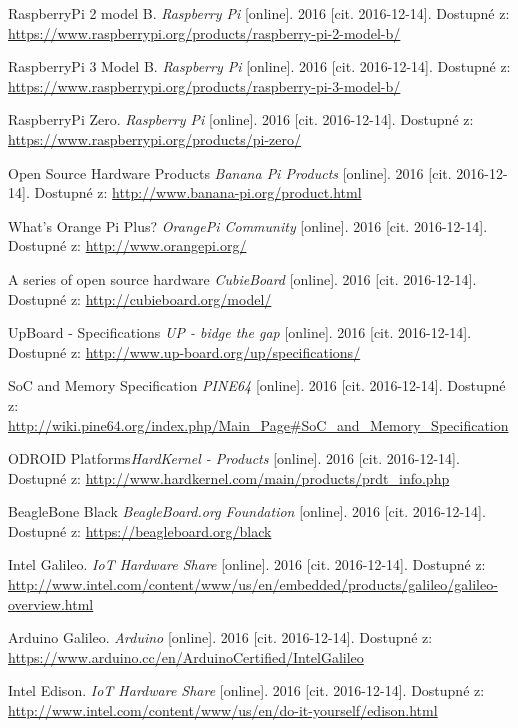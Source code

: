 \begin{literatura}{99}
 RaspberryPi 2 model B. \textit{Raspberry Pi} [online]. 2016 [cit. 2016-12-14]. Dostupné z: \url{https://www.raspberrypi.org/products/raspberry-pi-2-model-b/}

 RaspberryPi 3 Model B. \textit{Raspberry Pi} [online]. 2016 [cit. 2016-12-14]. Dostupné z: \url{https://www.raspberrypi.org/products/raspberry-pi-3-model-b/}

 RaspberryPi Zero. \textit{Raspberry Pi} [online]. 2016 [cit. 2016-12-14]. Dostupné z: \url{https://www.raspberrypi.org/products/pi-zero/}

 Open Source Hardware Products \textit{Banana Pi Products} [online]. 2016 [cit. 2016-12-14]. Dostupné z: \url{http://www.banana-pi.org/product.html}

 What’s Orange Pi Plus? \textit{OrangePi Community} [online]. 2016 [cit. 2016-12-14]. Dostupné z: \url{http://www.orangepi.org/}

 A series of open source hardware \textit{CubieBoard} [online]. 2016 [cit. 2016-12-14]. Dostupné z: \url{http://cubieboard.org/model/}

 UpBoard - Specifications \textit{UP - bidge the gap} [online]. 2016 [cit. 2016-12-14]. Dostupné z: \url{http://www.up-board.org/up/specifications/}

 SoC and Memory Specification \textit{PINE64} [online]. 2016 [cit. 2016-12-14]. Dostupné z: \url{http://wiki.pine64.org/index.php/Main\_Page\#SoC\_and\_Memory\_Specification}

 ODROID Platforms\textit{HardKernel - Products} [online]. 2016 [cit. 2016-12-14]. Dostupné z: \url{http://www.hardkernel.com/main/products/prdt\_info.php}

 BeagleBone Black \textit{BeagleBoard.org Foundation} [online]. 2016 [cit. 2016-12-14]. Dostupné z: \url{https://beagleboard.org/black}

 Intel Galileo. \textit{IoT Hardware Share} [online]. 2016 [cit. 2016-12-14]. Dostupné z: \url{http://www.intel.com/content/www/us/en/embedded/products/galileo/galileo-overview.html}

 Arduino Galileo. \textit{Arduino} [online]. 2016 [cit. 2016-12-14]. Dostupné z: \url{https://www.arduino.cc/en/ArduinoCertified/IntelGalileo}

 Intel Edison. \textit{IoT Hardware Share} [online]. 2016 [cit. 2016-12-14]. Dostupné z: \url{http://www.intel.com/content/www/us/en/do-it-yourself/edison.html}


\end{literatura}
